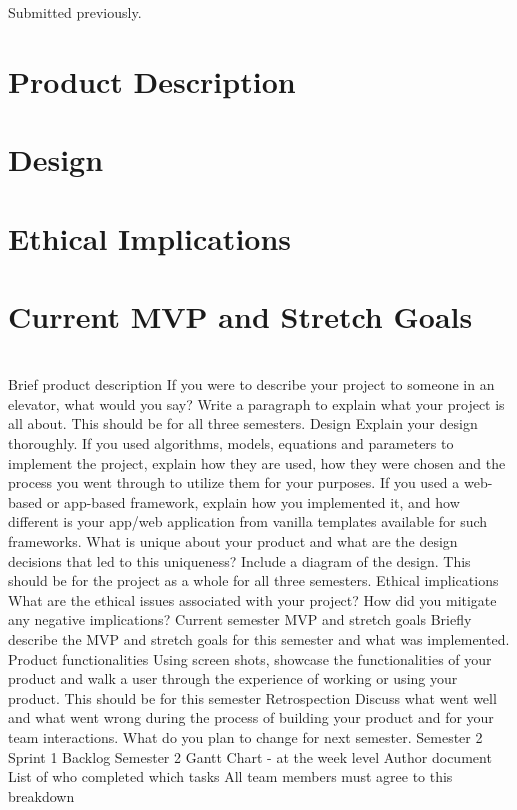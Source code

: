 \documentclass[12pt]{article}
\begin{document}
Submitted previously.

\section{Product Description}

\section{Design}

\section{Ethical Implications}

\section{Current MVP and Stretch Goals}

\section{}


            Brief product description
                If you were to describe your project to someone in an elevator, what would you say? Write a paragraph to explain what your project is all about. This should be for all three semesters.
            Design
                Explain your design thoroughly. If you used algorithms, models, equations and parameters to implement the project, explain how they are used, how they were chosen and the process you went through to utilize them for your purposes. If you used a web-based or app-based framework, explain how you implemented it, and how different is your app/web application from vanilla templates available for such frameworks. What is unique about your product and what are the design decisions that led to this uniqueness? Include a diagram of the design. This should be for the project as a whole for all three semesters.
            Ethical implications
                What are the ethical issues associated with your project?
                How did you mitigate any negative implications?
            Current semester MVP and stretch goals
                Briefly describe the MVP and stretch goals for this semester and what was implemented.
            Product functionalities
                Using screen shots, showcase the functionalities of your product and walk a user through the experience of working or using your product. This should be for this semester
            Retrospection
                Discuss what went well and what went wrong during the process of building your product and for your team interactions.
                What do you plan to change for next semester.
            Semester 2 Sprint 1 Backlog
            Semester 2 Gantt Chart - at the week level
            Author document
                List of who completed which tasks
                All team members must agree to this breakdown
\end{document}
